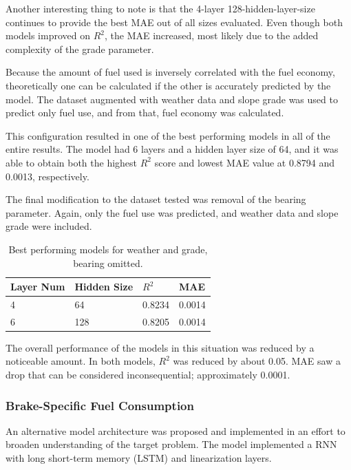 \documentclass[letterpaper]{article}
\begin{document}
Another interesting thing to note is that the 4-layer 128-hidden-layer-size 
continues to provide the best MAE out of all sizes evaluated. Even though 
both models improved on $R^{2}$, the MAE increased, most likely due to the 
added complexity of the grade parameter.

Because the amount of fuel used is inversely correlated with the fuel 
economy, theoretically one can be calculated if the other is accurately 
predicted by the model. The dataset augmented with weather data and slope 
grade was used to predict only fuel use, and from that, fuel economy was 
calculated.

This configuration resulted in one of the best performing models in all of 
the entire results. The model had 6 layers and a hidden layer size of 64, 
and it was able to obtain both the highest $R^{2}$ score and lowest MAE 
value at 0.8794 and 0.0013, respectively.

The final modification to the dataset tested was removal of the bearing 
parameter. Again, only the fuel use was predicted, and weather data and 
slope grade were included.

\begin{table}[]
    \centering
    \small
    \begin{tabular}{|l|l|l|l|}
        \hline
        \textbf{Layer Num} & \textbf{Hidden Size} & \textbf{$R^{2}$} & \textbf{MAE} \\
        \hline
        4              	& 64               	& 0.8234  	& 0.0014   	\\
        6              	& 128              	& 0.8205  	& 0.0014 	\\
        \hline
    \end{tabular}
    \caption{Best performing models for weather and grade, bearing omitted.}
    \label{tab:tb4}
\end{table}

The overall performance of the models in this situation was reduced by a 
noticeable amount. In both models, $R^{2}$ was reduced by about 0.05. MAE 
saw a drop that can be considered inconsequential; approximately 0.0001.

\subsubsection*{Brake-Specific Fuel Consumption}

An alternative model architecture was proposed and implemented in an effort 
to broaden understanding of the target problem. The model implemented a 
RNN with long short-term memory (LSTM) and linearization layers.
\end{document}
